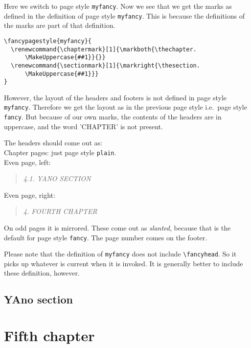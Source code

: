 \documentclass[openany]{book}
\renewcommand{\chaptermark}[1]{\markboth{\thechapter.\ #1}{}}
\renewcommand{\sectionmark}[1]{\markright{\thesection.\ #1}}
\renewcommand{\chaptermark}[1]{\markboth{\thechapter.
      \MakeUppercase{##1}}{}}
\renewcommand{\sectionmark}[1]{\markright{\thesection.
      \MakeUppercase{##1}}}
\renewcommand{\chaptermark}[1]{\markboth{\thechapter.\ ##1}{}}
\renewcommand{\sectionmark}[1]{\markright{\thesection.\ ##1}}
\begin{document}
\noindent
\begin{boxedminipage}{\textwidth}
Here we switch to page style \texttt{myfancy}.
Now we see that we get the marks as defined in the definition of page style \texttt{myfancy}.
This is because the definitions of the marks are  part of that definition.
\begin{verbatim}
\fancypagestyle{myfancy}{
  \renewcommand{\chaptermark}[1]{\markboth{\thechapter.
      \MakeUppercase{##1}}{}}
  \renewcommand{\sectionmark}[1]{\markright{\thesection.
      \MakeUppercase{##1}}}
}
\end{verbatim}

However, the layout of the headers and footers is not defined in page style \texttt{myfancy}. Therefore we get the layout as in the previous page style i.e.\ page style \texttt{fancy}. 
But because of our own marks, the contents of the headers are in uppercase, and the word 'CHAPTER' is not present.

The headers should come out as:
\\
Chapter pages: just page style \texttt{plain}.
\\
Even page, left:
\begin{quote}
  \textsl{4.1. YANO SECTION}
\end{quote}
Even page, right:
\begin{quote}
  \textsl{4. FOURTH CHAPTER}
\end{quote}
On odd pages it is mirrored.
These come out as \textsl{slanted}, because that is the default for page style \texttt{fancy}.
The page number comes on the footer.

Please note that the definition of \texttt{myfancy} does not include \verb|\fancyhead|. So it picks up whatever is current when it is invoked. It is generally better to include these definition, however.
\end{boxedminipage}
\bigskip

\lipsum[1]

\section{YAno section}

\lipsum

\newpage
\pagestyle{myotherfancy}
\chapter{Fifth chapter}
\end{document}
